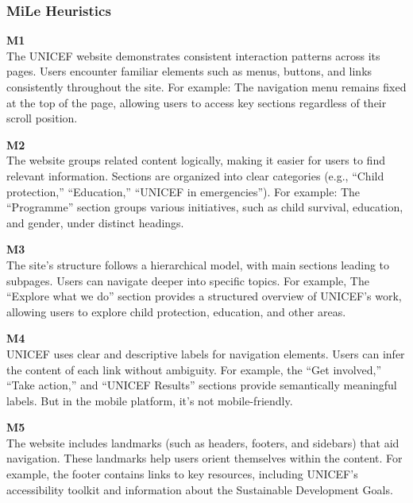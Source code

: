 \documentclass{article}
\begin{document}
\subsubsection{MiLe Heuristics}
\begin{description}
    \item {\textbf{M1} \color{unicefGray}{Consistency of interaction}}\\
    The UNICEF website demonstrates consistent interaction patterns across its pages. Users encounter familiar elements such as menus, buttons, and links consistently throughout the site. For example: The navigation menu remains fixed at the top of the page, allowing users to access key sections regardless of their scroll position.
    \item {\textbf{M2} \color{unicefGray}{Group navigation}}\\
    The website groups related content logically, making it easier for users to find relevant information. Sections are organized into clear categories (e.g., “Child protection,” “Education,” “UNICEF in emergencies”). For example: The “Programme” section groups various initiatives, such as child survival, education, and gender, under distinct headings.
    \item {\textbf{M3} \color{unicefGray}{Structural navigation}}\\
    The site’s structure follows a hierarchical model, with main sections leading to subpages. Users can navigate deeper into specific topics. For example, The “Explore what we do” section provides a structured overview of UNICEF’s work, allowing users to explore child protection, education, and other areas.
    \item {\textbf{M4} \color{unicefGray}{Semantic navigation}}\\
    UNICEF uses clear and descriptive labels for navigation elements. Users can infer the content of each link without ambiguity. For example, the “Get involved,” “Take action,” and “UNICEF Results” sections provide semantically meaningful labels. But in the mobile platform, it's not mobile-friendly.
    \item {\textbf{M5} \color{unicefGray}{Presence of landmarks}}\\
    The website includes landmarks (such as headers, footers, and sidebars) that aid navigation. These landmarks help users orient themselves within the content. For example, the footer contains links to key resources, including UNICEF’s accessibility toolkit and information about the Sustainable Development Goals.
\end{description}
\end{document}
